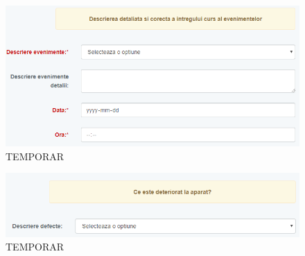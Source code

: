 	\begin{figure}
		\includegraphics[width=\linewidth]{../imagini/register_decurs.png}
		\caption{TEMPORAR}
		\label{fig:TEMP}
	\end{figure}
	\begin{figure}
		\includegraphics[width=\linewidth]{../imagini/register_deteriorat.png}
		\caption{TEMPORAR}
		\label{fig:TEMP}
	\end{figure}
